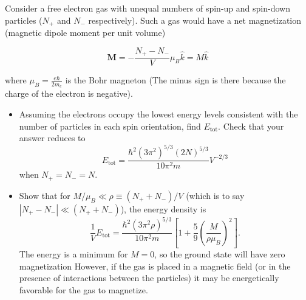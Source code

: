 \documentclass{article}
\begin{document}
\begin{ques}
Consider a free electron gas with unequal numbers of spin-up and spin-down particles ($N_+$
and $N_-$ respectively). Such a gas would have a net magnetization (magnetic dipole
moment per unit volume)

\[
\mathbf{M} = -\frac{N_+ - N_-}{V} \mu_B \hat{k} = M \hat{k}
\]

where $\mu_B = \frac{e\hbar}{2m_e}$ is the Bohr magneton (The minus sign is there because the charge of
the electron is negative).
\begin{itemize}
    \item[(a)] Assuming the electrons occupy the lowest energy levels consistent with the number of particles in each spin orientation, find $E_{\text{tot}}$. Check that your answer reduces to
\[
E_{\text{tot}} =
\frac{\hbar^2 (3\pi^2)^{5/3} (2N)^{5/3}}
{10\pi^2 m}
V^{-2/3}
\]
when $N_+ = N_- = N$.
    \item[(b)] Show that for $M/\mu_B \ll \rho \equiv (N_+ + N_-)/V$ (which is to say $|N_+ - N_-| \ll (N_+ + N_-)$), the energy density is
\[
\frac{1}{V} E_{\text{tot}} =
\frac{\hbar^2 (3\pi^2 \rho)^{5/3}}
{10\pi^2 m}
\left[
1 + \frac{5}{9}
\left(
\frac{M}{\rho \mu_B}
\right)^2
\right].
\]
The energy is a minimum for $M = 0$, so the ground state will have zero magnetization However, if the gas is placed in a magnetic field (or in the presence of interactions between the particles) it may be energetically favorable for the gas to magnetize.
\end{itemize}
\end{ques}
\end{document}
